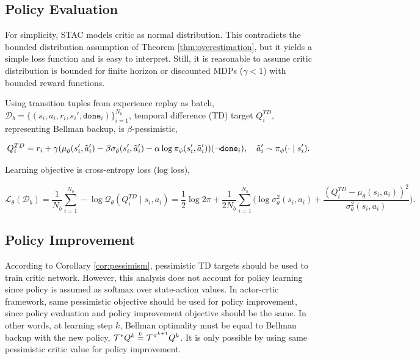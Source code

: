 \documentclass[10pt]{article} %
\newcommand\disteq{\mathrel{\stackrel{\makebox[0pt]{\mbox{\normalfont\tiny D}}}{=}}}
\begin{document}
\subsection{Policy Evaluation}

For simplicity, STAC models critic as normal distribution. This contradicts the bounded distribution assumption of Theorem \ref{thm:overestimation}, but it yields a simple loss function and is easy to interpret. Still, it is reasonable to assume critic distribution is bounded for finite horizon or discounted MDPs ($\gamma<1$) with bounded reward functions. %

Using transition tuples from experience replay as batch, $\mathcal{D}_b = \{(s_i, a_i, r_i, s_i', \texttt{done}_i)\}_{i=1}^{N_b}$, temporal difference (TD) target $Q_i^{TD}$, representing Bellman backup, is $\beta$-pessimistic, 

\begin{equation}
	\label{eqn:td_target}
	Q_i^{TD} = r_i + \gamma (\mu_{\bar{\theta}}(s_i', \Tilde{a}_{i}') - \beta \sigma_{\bar{\theta}}(s_i', \Tilde{a}_{i}') - \alpha \log \pi_{\phi}(s_i', \Tilde{a}_{i}')) (\neg\texttt{done}_i), \quad \Tilde{a}_{i}'\sim\pi_{\phi}(\cdot \mid s_i'). 
\end{equation}

Learning objective is cross-entropy loss (log loss), 

\begin{equation}
	\mathcal{L}_{\theta}(\mathcal{D}_b) = \frac{1}{N_{b}} \sum_{i=1}^{N_b}  - \log{\mathcal{Q}_{\theta} (Q_i^{TD} \mid s_i,a_i)} = \frac{1}{2} \log{2\pi} + \frac{1}{2 N_{b}} \sum_{i=1}^{N_b}  \Big( \log{\sigma^2_{\theta}(s_i,a_i)} + \frac{(Q_i^{TD} - \mu_{\theta} (s_i,a_i))^2}{\sigma^2_{\theta}(s_i,a_i)} \Big). 
\end{equation}

\subsection{Policy Improvement}

According to Corollary \ref{cor:pessimism}, pessimistic TD targets should be used to train critic network. However, this analysis does not account for policy learning since policy is assumed as $\text{softmax}$ over state-action values. In actor-crtic framework, same pessimistic objective should be used for policy improvement, since policy evaluation and policy improvement objective should be the same. In other words, at learning step $k$, Bellman optimality must be equal to Bellman backup with the new policy, $\mathcal{T}^* Q^k \disteq \mathcal{T}^{\pi^{k+1}} Q^k$. It is only possible by using same pessimistic critic value for policy improvement. 
\end{document}
